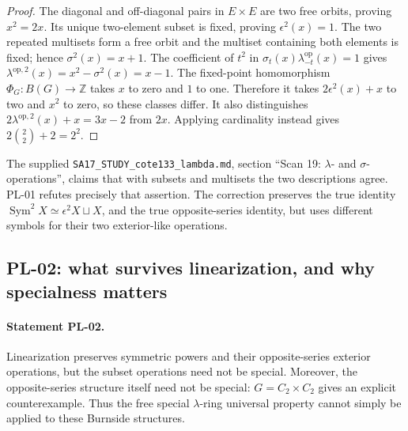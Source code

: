 \documentclass[11pt,a4paper]{article}
\begin{document}
\begin{proof}
The diagonal and off-diagonal pairs in $E\times E$ are two free orbits, proving
$x^2=2x$. Its unique two-element subset is fixed, proving $\epsilon^2(x)=1$.
The two repeated multisets form a free orbit and the multiset containing both
elements is fixed; hence $\sigma^2(x)=x+1$. The coefficient of $t^2$ in
$\sigma_t(x)\lambda^{\mathrm{op}}_{-t}(x)=1$ gives
$\lambda^{\mathrm{op},2}(x)=x^2-\sigma^2(x)=x-1$.
The fixed-point homomorphism $\Phi_G:B(G)\to\mathbb Z$ takes $x$ to zero
and $1$ to one. Therefore it takes $2\epsilon^2(x)+x$ to two and $x^2$ to
zero, so these classes differ. It also distinguishes
$2\lambda^{\mathrm{op},2}(x)+x=3x-2$ from $2x$.
Applying cardinality instead gives $2\binom{2}{2}+2=2^2$.
\end{proof}

The supplied \texttt{SA17\_STUDY\_cote133\_lambda.md}, section
``Scan 19: $\lambda$- and $\sigma$-operations'', claims that with subsets and
multisets the two descriptions agree. PL-01 refutes precisely that assertion.
The correction preserves the true identity
$\operatorname{Sym}^2X\simeq\epsilon^2X\sqcup X$, and the true opposite-series
identity, but uses different symbols for their two exterior-like operations.

\subsection{PL-02: what survives linearization, and why specialness matters}
\paragraph{Statement PL-02.}
Linearization preserves symmetric powers and their opposite-series exterior
operations, but the subset operations need not be special. Moreover, the
opposite-series structure itself need not be special: $G=C_2\times C_2$ gives
an explicit counterexample. Thus the free special $\lambda$-ring universal
property cannot simply be applied to these Burnside structures.
\end{document}
